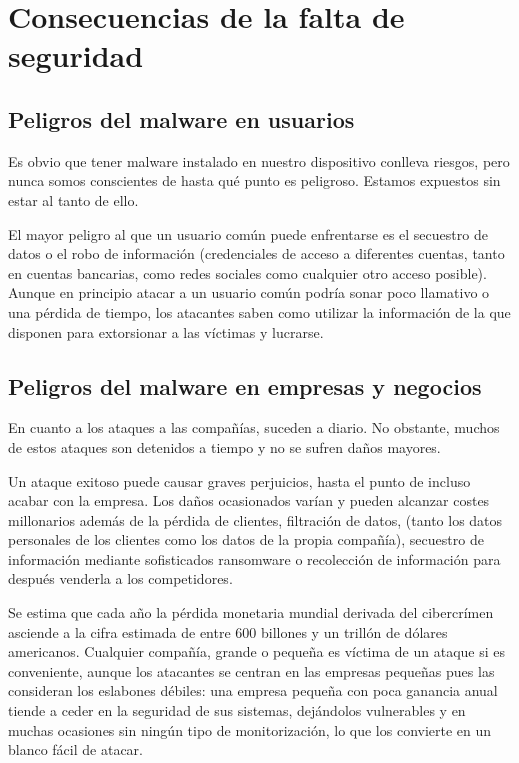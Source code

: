 \section{Consecuencias de la falta de seguridad}

\subsection{Peligros del malware en usuarios}

Es obvio que tener malware instalado en nuestro dispositivo conlleva riesgos, pero nunca somos conscientes de hasta qué punto es peligroso. Estamos expuestos sin estar al tanto de ello.

El mayor peligro al que un usuario común puede enfrentarse es el secuestro de datos o el robo de información (credenciales de acceso a diferentes cuentas, tanto en cuentas bancarias, como redes sociales como cualquier otro acceso posible). Aunque en principio atacar a un usuario común podría sonar poco llamativo o una pérdida de tiempo, los atacantes saben como utilizar la información de la que disponen para extorsionar a las víctimas y lucrarse\hypersetup{citecolor=red}\cite{risks}.

\subsection{Peligros del malware en empresas y negocios}

En cuanto a los ataques a las compañías, suceden a diario. No obstante, muchos de estos ataques son detenidos a tiempo y no se sufren daños mayores.

Un ataque exitoso puede causar graves perjuicios, hasta el punto de incluso acabar con la empresa. Los daños ocasionados varían y pueden alcanzar costes millonarios además de la pérdida de clientes, filtración de datos, (tanto los datos personales de los clientes como los datos de la propia compañía), secuestro de información mediante sofisticados ransomware o recolección de información para después venderla a los competidores\hypersetup{citecolor=red}\cite{risks}.

Se estima que cada año la pérdida monetaria mundial derivada del cibercrímen asciende a la cifra estimada de entre 600 billones y un trillón de dólares americanos\hypersetup{citecolor=red}\cite{mcafee}. Cualquier compañía, grande o pequeña es víctima de un ataque si es conveniente, aunque los atacantes se centran en las empresas pequeñas pues las consideran los eslabones débiles: una empresa pequeña con poca ganancia anual tiende a ceder en la seguridad de sus sistemas, dejándolos vulnerables y en muchas ocasiones sin ningún tipo de monitorización, lo que los convierte en un blanco fácil de atacar.

